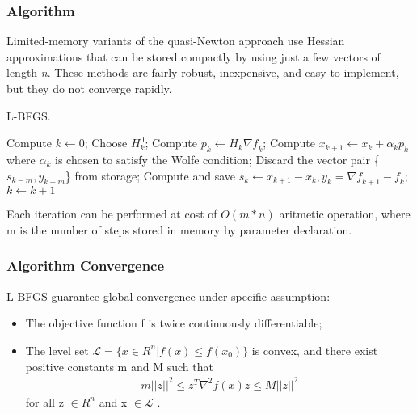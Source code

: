 \subsubsection{Algorithm}
Limited-memory variants  of  the  quasi-Newton  approach use  Hessian  approximations  that  can  be stored compactly by using just a few vectors of length \textit{n}. These methods are fairly robust, inexpensive, and easy to implement, but they do not converge rapidly.

\begin{algorithm}[H]
	\caption{L-BFGS.}
	\label{alg:LBFGS}
	\begin{algorithmic}[4]
		\State Compute $k \gets 0$;
		\Repeat
		\State Choose \textbf{$H^0_k$};
		\State Compute $p_k \gets H_k\nabla \textit{f}_k$;
		\State Compute $x_{k+1} \gets x_{k}+ \alpha_{k}p_{k}$ where $\alpha_{k}$ is chosen to satisfy the Wolfe condition;
		\State Discard the vector pair \{$s_{k-m},y_{k-m}$\} from storage;
		\EndIf
		\State Compute and save $s_k \gets x_{k+1}-x_{k}, y_k=\nabla \textit{f}_{k+1}-\textit{f}_k$;
		\State $k \gets k+1$
		\EndProcedure 
	\end{algorithmic}
\end{algorithm}

Each iteration can be performed at cost of $O(m*n)$ aritmetic operation, where m is the number of steps stored in memory by parameter declaration.

\subsubsection{Algorithm Convergence}

L-BFGS guarantee global convergence under specific assumption:
\begin{itemize} \label{convergence:assumption}
	\item The objective function f is twice continuously differentiable;
	\item The level set $ \mathcal{L} = \{x \in R^n | \mathit{f(x)}  \leq  \mathit{f(x_0)}\}$ is convex, and there exist positive constants m and M such that 
	\begin{align}
	m||z||^2 \leq z^T \nabla^2f(x)z \leq M||z||^2
	\end{align}
	for all z $\in R^n$  and x $\in \mathcal{L}$ .
\end{itemize}

